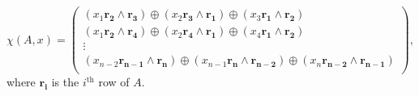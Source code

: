 \documentclass{article}
\begin{document}
	\begin{equation}
		\chi(A,x) = \begin{pmatrix}
		(x_1\mathbf{r_2}\wedge\mathbf{r_3})\oplus (x_2\mathbf{r_3}\wedge\mathbf{r_1})\oplus (x_3\mathbf{r_1}\wedge\mathbf{r_2})\\
		(x_1\mathbf{r_2}\wedge\mathbf{r_4})\oplus (x_2\mathbf{r_4}\wedge\mathbf{r_1})\oplus (x_4\mathbf{r_1}\wedge\mathbf{r_2})\\
		\vdots \\
		(x_{n-2}\mathbf{r_{n-1}}\wedge\mathbf{r_{n}})\oplus (x_{n-1}\mathbf{r_{n}}\wedge\mathbf{r_{n-2}})\oplus (x_{n}\mathbf{r_{n-2}}\wedge\mathbf{r_{n-1}})\\
		\end{pmatrix},
	\end{equation}
	where $\mathbf{r_i}$ is the $i^{\text{th}}$ row of $A$.
	
\end{document}
